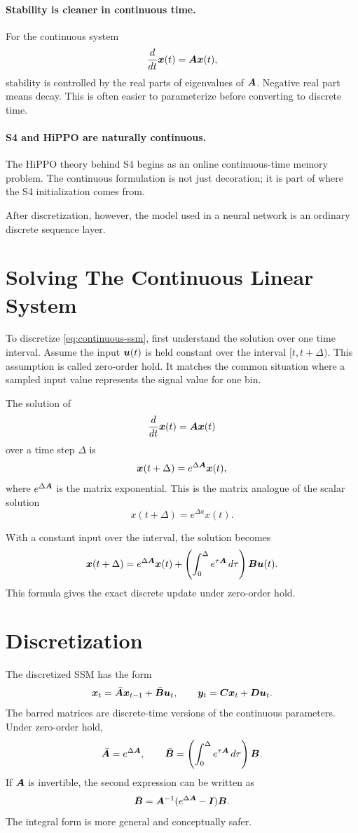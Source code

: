 \paragraph{Stability is cleaner in continuous time.}
For the continuous system
\[
  \frac{d}{dt}\bm{x}(t)=\bm{A}\bm{x}(t),
\]
stability is controlled by the real parts of eigenvalues of $\bm{A}$. Negative real part
means decay. This is often easier to parameterize before converting to discrete time.

\paragraph{S4 and HiPPO are naturally continuous.}
The HiPPO theory behind S4 begins as an online continuous-time memory problem. The
continuous formulation is not just decoration; it is part of where the S4 initialization
comes from.

After discretization, however, the model used in a neural network is an ordinary discrete
sequence layer.

\section{Solving The Continuous Linear System}

To discretize \eqref{eq:continuous-ssm}, first understand the solution over one time
interval. Assume the input $\bm{u}(t)$ is held constant over the interval $[t, t+\Delta)$.
This assumption is called zero-order hold. It matches the common situation where a
sampled input value represents the signal value for one bin.

The solution of
\[
  \frac{d}{dt}\bm{x}(t)=\bm{A}\bm{x}(t)
\]
over a time step $\Delta$ is
\[
  \bm{x}(t+\Delta)=e^{\Delta \bm{A}}\bm{x}(t),
\]
where $e^{\Delta \bm{A}}$ is the matrix exponential. This is the matrix analogue of the
scalar solution
\[
  x(t+\Delta)=e^{\Delta a}x(t).
\]

With a constant input over the interval, the solution becomes
\[
  \bm{x}(t+\Delta)
  =
  e^{\Delta \bm{A}}\bm{x}(t)
  +
  \left(\int_0^\Delta e^{\tau \bm{A}}\,d\tau\right)\bm{B}\bm{u}(t).
\]
This formula gives the exact discrete update under zero-order hold.

\section{Discretization}

The discretized SSM has the form
\begin{equation}
  \bm{x}_t = \bar{\bm{A}}\bm{x}_{t-1} + \bar{\bm{B}}\bm{u}_t,
  \qquad
  \bm{y}_t = \bm{C}\bm{x}_t + \bm{D}\bm{u}_t.
  \label{eq:discretized-ssm}
\end{equation}
The barred matrices are discrete-time versions of the continuous parameters. Under
zero-order hold,
\begin{equation}
  \bar{\bm{A}} = e^{\Delta \bm{A}},
  \qquad
  \bar{\bm{B}}
  =
  \left(\int_0^\Delta e^{\tau \bm{A}}\,d\tau\right)\bm{B}.
  \label{eq:zoh-discretization}
\end{equation}
If $\bm{A}$ is invertible, the second expression can be written as
\[
  \bar{\bm{B}}
  =
  \bm{A}^{-1}(e^{\Delta \bm{A}}-\bm{I})\bm{B}.
\]
The integral form is more general and conceptually safer.


